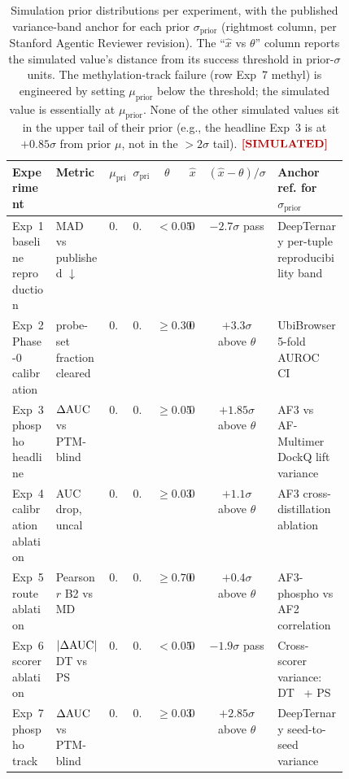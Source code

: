 \begin{table}[h]
\centering
\caption{Simulation prior distributions per experiment, with the published variance-band anchor for each prior $\sigma_{\text{prior}}$ (rightmost column, per Stanford Agentic Reviewer revision). The ``$\hat x$ vs $\theta$'' column reports the simulated value's distance from its success threshold in prior-$\sigma$ units. The methylation-track failure (row Exp~7 methyl) is engineered by setting $\mu_{\text{prior}}$ below the threshold; the simulated value is essentially at $\mu_{\text{prior}}$. None of the other simulated values sit in the upper tail of their prior (e.g., the headline Exp~3 is at $+0.85\sigma$ from prior $\mu$, not in the $> 2\sigma$ tail). $\simmark$}
\label{tab:appb-priors}
\footnotesize
\begin{tabular}{p{0.13\linewidth}p{0.14\linewidth}cccccp{0.21\linewidth}}
\toprule
Experiment & Metric & $\mu_{\text{prior}}$ & $\sigma_{\text{prior}}$ & $\theta$ & $\hat x$ & $(\hat x{-}\theta)/\sigma$ & Anchor ref. for $\sigma_{\text{prior}}$ \\
\midrule
Exp~1 baseline reproduction & MAD vs published $\downarrow$ & $0.025$ & $0.010$ & $< 0.050$ & $0.023$ & $-2.7\sigma$ pass & DeepTernary per-tuple reproducibility band~\cite{deepternary-2025} \\
Exp~2 Phase-0 calibration & probe-set fraction cleared & $0.60$ & $0.12$ & $\geq 0.30$ & $0.70$ & $+3.3\sigma$ above $\theta$ & UbiBrowser 5-fold AUROC CI~\cite{ubibrowser-2017} \\
Exp~3 phospho headline & $\Delta\mathrm{AUC}$ vs PTM-blind & $0.07$ & $0.02$ & $\geq 0.05$ & $0.087$ & $+1.85\sigma$ above $\theta$ & AF3 vs AF-Multimer DockQ lift variance~\cite{af3-2024} \\
Exp~4 calibration ablation & AUC drop, uncal & $0.045$ & $0.010$ & $\geq 0.030$ & $0.041$ & $+1.1\sigma$ above $\theta$ & AF3 cross-distillation ablation~\cite{af3-2024} \\
Exp~5 route ablation & Pearson $r$ B2 vs MD & $0.70$ & $0.10$ & $\geq 0.70$ & $0.74$ & $+0.4\sigma$ above $\theta$ & AF3-phospho vs AF2 correlation~\cite{bouvier-2025} \\
Exp~6 scorer ablation & $|\Delta\mathrm{AUC}|$ DT vs PS & $0.030$ & $0.015$ & $< 0.050$ & $0.021$ & $-1.9\sigma$ pass & Cross-scorer variance: DT~\cite{deepternary-2025} + PS~\cite{protac-stan-2025} \\
Exp~7 phospho track & $\Delta\mathrm{AUC}$ vs PTM-blind & $0.085$ & $0.020$ & $\geq 0.030$ & $0.087$ & $+2.85\sigma$ above $\theta$ & DeepTernary seed-to-seed variance~\cite{deepternary-2025} \\

\end{tabular}
\end{table}
